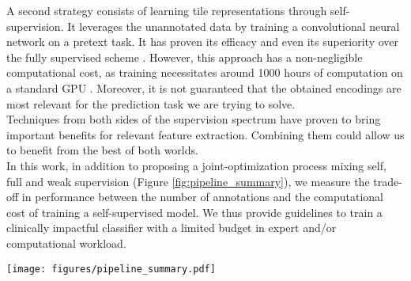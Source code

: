 A second strategy consists of learning tile representations through self-supervision. It leverages the unannotated data by training a convolutional neural network on a pretext task. It has proven its efficacy \citep{saillard_identification_2021, lu_data-efficient_2021} and even its superiority over the fully supervised scheme \citep{dehaene_self-supervision_2020}. However, this approach has a non-negligible computational cost, as training necessitates around 1000 hours of computation on a standard GPU \citep{dehaene_self-supervision_2020}. Moreover, it is not guaranteed that the obtained encodings are most relevant for the prediction task we are trying to solve. \\
Techniques from both sides of the supervision spectrum have proven to bring important benefits for relevant feature extraction. Combining them could allow us to benefit from the best of both worlds. \\
In this work, in addition to proposing a joint-optimization process mixing self, full and weak supervision (Figure \ref{fig:pipeline_summary}), we measure the trade-off in performance between the number of annotations and the computational cost of training a self-supervised model. We thus provide guidelines to train a clinically impactful classifier with a limited budget in expert and/or computational workload. \\

\begin{figure*}[!t]
\centering
\texttt{[image: figures/pipeline\_summary.pdf]}
\caption{\textbf{Mixed Supervision Process}: \textbf{a)}A self-supervised model (SimCLR) is trained on unlabelled tiles extracted from the slides. Feature extractor and contrastive layer weights are transferred to the joint-optimization architecture \textbf{b)} Joint-optimization model is trained on the labeled tiles of the dataset. The feature extractor weights are transferred to the WS classification model. \textbf{c)} WS classification model is trained on the 1015 whole slide images.}
\label{fig:pipeline_summary}
\end{figure*}


